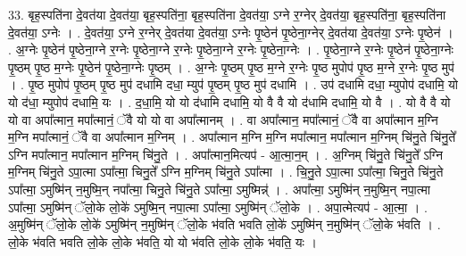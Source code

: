 \documentclass[17pt]{extarticle}
\begin{document}
33. बृह॒स्पति॑ना दे॒वत॑या दे॒वत॑या॒ बृह॒स्पति॑ना॒ बृह॒स्पति॑ना दे॒वत॑या॒ ऽग्ने र॒ग्नेर् दे॒वत॑या॒ बृह॒स्पति॑ना॒ बृह॒स्पति॑ना दे॒वत॑या॒ ऽग्नेः । . दे॒वत॑या॒ ऽग्ने र॒ग्नेर् दे॒वत॑या दे॒वत॑या॒ ऽग्नेः पृ॒ष्ठेन॑ पृ॒ष्ठेना॒ग्नेर् दे॒वत॑या दे॒वत॑या॒ ऽग्नेः पृ॒ष्ठेन॑ । . अ॒ग्नेः पृ॒ष्ठेन॑ पृ॒ष्ठेना॒ग्ने र॒ग्नेः पृ॒ष्ठेना॒ग्ने र॒ग्नेः पृ॒ष्ठेना॒ग्ने र॒ग्नेः पृ॒ष्ठेना॒ग्नेः । . पृ॒ष्ठेना॒ग्ने र॒ग्नेः पृ॒ष्ठेन॑ पृ॒ष्ठेना॒ग्नेः पृ॒ष्ठम् पृ॒ष्ठ म॒ग्नेः पृ॒ष्ठेन॑ पृ॒ष्ठेना॒ग्नेः पृ॒ष्ठम् । . अ॒ग्नेः पृ॒ष्ठम् पृ॒ष्ठ म॒ग्ने र॒ग्नेः पृ॒ष्ठ मुपोप॑ पृ॒ष्ठ म॒ग्ने र॒ग्नेः पृ॒ष्ठ मुप॑ । . पृ॒ष्ठ मुपोप॑ पृ॒ष्ठम् पृ॒ष्ठ मुप॑ दधामि दधा॒ म्युप॑ पृ॒ष्ठम् पृ॒ष्ठ मुप॑ दधामि । . उप॑ दधामि दधा॒ म्युपोप॑ दधामि॒ यो यो द॑धा॒ म्युपोप॑ दधामि॒ यः । . द॒धा॒मि॒ यो यो द॑धामि दधामि॒ यो वै वै यो द॑धामि दधामि॒ यो वै । . यो वै वै यो यो वा अपा᳚त्मान॒ मपा᳚त्मानं॒ ॅवै यो यो वा अपा᳚त्मानम् । . वा अपा᳚त्मान॒ मपा᳚त्मानं॒ ॅवै वा अपा᳚त्मान म॒ग्नि म॒ग्नि मपा᳚त्मानं॒ ॅवै वा अपा᳚त्मान म॒ग्निम् । . अपा᳚त्मान म॒ग्नि म॒ग्नि मपा᳚त्मान॒ मपा᳚त्मान म॒ग्निम् चि॑नु॒ते चि॑नु॒ते᳚ ऽग्नि मपा᳚त्मान॒ मपा᳚त्मान म॒ग्निम् चि॑नु॒ते । . अपा᳚त्मान॒मित्यप॑ - आ॒त्मा॒न॒म् । . अ॒ग्निम् चि॑नु॒ते चि॑नु॒ते᳚ ऽग्नि म॒ग्निम् चि॑नु॒ते ऽपा॒त्मा ऽपा᳚त्मा॒ चिनु॒ते᳚ ऽग्नि म॒ग्निम् चि॑नु॒ते ऽपा᳚त्मा । . चि॒नु॒ते ऽपा॒त्मा ऽपा᳚त्मा॒ चिनु॒ते चि॑नु॒ते ऽपा᳚त्मा॒ ऽमुष्मि॑न् न॒मुष्मि॒न् नपा᳚त्मा॒ चिनु॒ते चि॑नु॒ते ऽपा᳚त्मा॒ ऽमुष्मिन्न्॑ । . अपा᳚त्मा॒ ऽमुष्मि॑न् न॒मुष्मि॒न् नपा॒त्मा ऽपा᳚त्मा॒ ऽमुष्मि॑न् ॅलो॒के लो॒के॑ ऽमुष्मि॒न् नपा॒त्मा ऽपा᳚त्मा॒ ऽमुष्मि॑न् ॅलो॒के । . अपा॒त्मेत्यप॑ - आ॒त्मा॒ । . अ॒मुष्मि॑न् ॅलो॒के लो॒के॑ ऽमुष्मि॑न् न॒मुष्मि॑न् ॅलो॒के भ॑वति भवति लो॒के॑ ऽमुष्मि॑न् न॒मुष्मि॑न् ॅलो॒के भ॑वति । . लो॒के भ॑वति भवति लो॒के लो॒के भ॑वति॒ यो यो भ॑वति लो॒के लो॒के भ॑वति॒ यः । \newline
\end{document}
